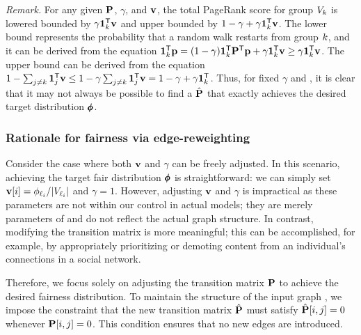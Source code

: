 \documentclass[sigconf, anonymous, review]{acmart}
\begin{document}
\vspace{1mm}
\noindent
\emph{Remark.}  
For any given $\mathbf{{P}}$, $\gamma$, and $\mathbf{{v}}$, the total PageRank score for group $\group_\agroup$ is lowered bounded by $\gamma \mathbf{{1}}_{k}^{\mathsf{T}} \mathbf{{v}}$ and upper bounded by $1-\gamma + \gamma \mathbf{{1}}_{k}^{\mathsf{T}} \mathbf{{v}}$. The lower bound represents the probability that a random walk restarts from group $k$, and it can be derived from the equation $\mathbf{{1}}_{k}^{\mathsf{T}} \mathbf{{p}} = (1 - \gamma)  \mathbf{{1}}_{k}^{\mathsf{T}}  \mathbf{{P}}^{\mathsf{T}} \mathbf{{p}} + \gamma \mathbf{{1}}_{k}^{\mathsf{T}} \mathbf{{v}} \geq \gamma \mathbf{{1}}_{k}^{\mathsf{T}} \mathbf{{v}}$. The upper bound can be derived from the equation $1 - \sum_{j \neq k} \mathbf{{1}}_{j}^{\mathsf{T}} \mathbf{{v}} \leq 1 - \gamma \sum_{j \neq k} \mathbf{{1}}_{j}^{\mathsf{T}} \mathbf{{v}} = 1 - \gamma + \gamma \mathbf{{1}}_{k}^{\mathsf{T}}$. 
Thus, for fixed $\gamma$ and \vectv, it is clear that it may not always be possible to find a $\hat{\mathbf{{P}}}$ that exactly achieves the desired target distribution $\pmb{\phi}$.





\subsubsection{Rationale for \pagerank fairness via edge-re\-weighting}
%
Consider the case where both $\mathbf{{v}}$ and $\gamma$ can be freely adjusted. In this scenario, achieving the target fair distribution $\pmb{\phi}$ is straightforward: we can simply set $\vectv[i] = {\grouppr_{\labelof_i}}/{|\group_{\labelof_i}|}$ and $\gamma = 1$. However, adjusting $\mathbf{{v}}$ and $\gamma$ is impractical 
as these parameters are not within our control in actual models; they are merely parameters of \pagerank and do not reflect the actual graph structure. In contrast, modifying the transition matrix is more meaningful; this can be accomplished, for example, by appropriately prioritizing or demoting content from an individual's connections in a social network.

Therefore, we focus solely on adjusting the transition matrix $\mathbf{{P}}$ to achieve the desired fairness distribution. To maintain the structure of the input graph \graph, 
we impose the constraint that the new transition matrix $\hat{\mathbf{{P}}}$ must satisfy $\hat{\mathbf{{P}}}[i, j] = 0$ whenever $\mathbf{{P}}[i, j] = 0$. This condition ensures that no new edges are introduced.
\end{document}

